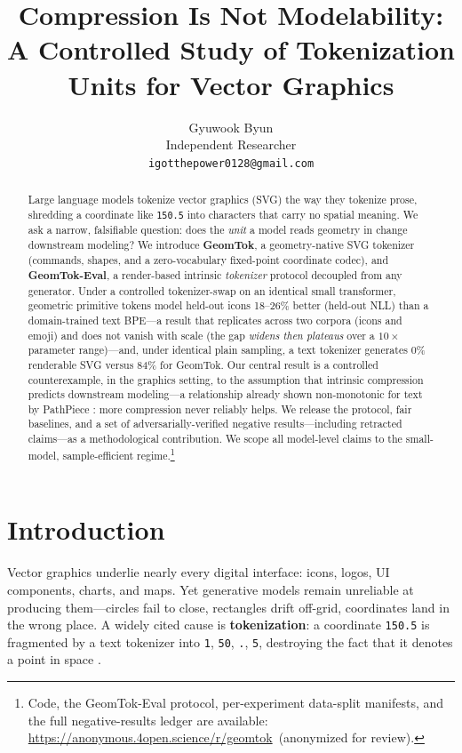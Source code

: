 \documentclass[11pt]{article}
\title{Compression Is Not Modelability:\\ A Controlled Study of Tokenization Units for Vector Graphics}
\author{Gyuwook Byun \\
  Independent Researcher \\
  \texttt{igotthepower0128@gmail.com}}
\newcommand{\resourceurl}{\url{https://anonymous.4open.science/r/geomtok}\ (anonymized for review)}
\newcommand{\resourceurl}{\url{https://github.com/Stayhealthy88/GeomTok}}
\begin{document}
\maketitle

\begin{abstract}
Large language models tokenize vector graphics (SVG) the way they tokenize prose, shredding a coordinate like \texttt{150.5} into characters that carry no spatial meaning. We ask a narrow, falsifiable question: does the \emph{unit} a model reads geometry in change downstream modeling? We introduce \textbf{GeomTok}, a geometry-native SVG tokenizer (commands, shapes, and a zero-vocabulary fixed-point coordinate codec), and \textbf{GeomTok-Eval}, a render-based intrinsic \emph{tokenizer} protocol decoupled from any generator. Under a controlled tokenizer-swap on an identical small transformer, geometric primitive tokens model held-out icons 18--26\% better (held-out NLL) than a domain-trained text BPE---a result that replicates across two corpora (icons and emoji) and does not vanish with scale (the gap \emph{widens then plateaus} over a $10\times$ parameter range)---and, under identical plain sampling, a text tokenizer generates 0\% renderable SVG versus 84\% for GeomTok. Our central result is a controlled counterexample, in the graphics setting, to the assumption that intrinsic compression predicts downstream modeling---a relationship already shown non-monotonic for text by PathPiece \citep{schmidt2024pathpiece}: more compression never reliably helps. We release the protocol, fair baselines, and a set of adversarially-verified negative results---including retracted claims---as a methodological contribution. We scope all model-level claims to the small-model, sample-efficient regime.\footnote{Code, the GeomTok-Eval protocol, per-experiment data-split manifests, and the full negative-results ledger are available: \resourceurl.}
\end{abstract}

\section{Introduction}
Vector graphics underlie nearly every digital interface: icons, logos, UI components, charts, and maps. Yet generative models remain unreliable at producing them---circles fail to close, rectangles drift off-grid, coordinates land in the wrong place. A widely cited cause is \textbf{tokenization}: a coordinate \texttt{150.5} is fragmented by a text tokenizer into \texttt{1}, \texttt{50}, \texttt{.}, \texttt{5}, destroying the fact that it denotes a point in space \citep{xing2024llm4svg}.
\end{document}
